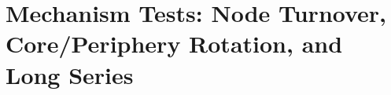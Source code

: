 \documentclass[11pt, letterpaper]{article}
\numberwithin{equation}{section}
\begin{document}
\begin{table}[htbp]
\centering\scriptsize\setlength{\tabcolsep}{4pt}
\caption{Paired differences and 95\% confidence intervals for every DynMux-versus-baseline comparison of $K$ MAE, by network regime and change intensity ($n = 270$ per comparison, baseline minus DynMux, so positive values favor DynMux).}
\label{tab:app_paired_ci_kmae}

\end{table}

\begin{table}[htbp]
\centering\scriptsize
\caption{Paired Wilcoxon signed-rank tests of DynMux (Jaccard) against each baseline, by regime and metric ($n = 540$ series per regime).}
\label{tab:app_paired_wilcoxon}

\end{table}

\section{Mechanism Tests: Node Turnover, Core/Periphery Rotation, and Long Series}
\label{app:mechanism}

\begin{table}[ht]
\centering\small
\caption{Mechanism tests: joint NMI, layer NMI and $K$ MAE by regime and method (means over configurations and replicates), with the paired DynMux-minus-multislice difference and the share of series in which DynMux is more accurate.}
\label{tab:app_mechanism}

\end{table}
\end{document}
